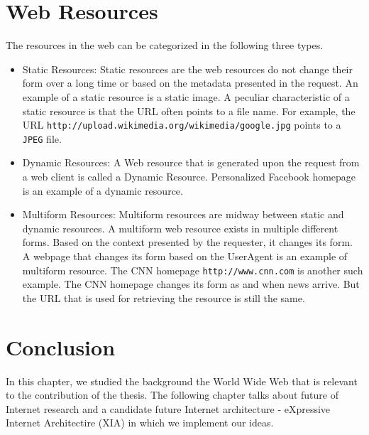 \section{Web Resources}
The resources in the web can be categorized in the following three
types.

\begin{itemize}
  \item{Static Resources: Static resources are the web resources do
    not change their form over a long time or based on the metadata
    presented in the request. An example of a static resource is a
    static image. A peculiar characteristic of a static resource is
    that the URL often points to a file name. For example, the URL
    \texttt{http://upload.wikimedia.org/wikimedia/google.jpg} points
    to a \texttt{JPEG} file.}
  \item{Dynamic Resources: A Web resource that is generated upon the
    request from a web client is called a Dynamic
    Resource. Personalized Facebook homepage is an example of a
    dynamic resource.}
  \item{Multiform Resources: Multiform resources are midway between
    static and dynamic resources. A multiform web resource exists in
    multiple different forms. Based on the context presented by the
    requester, it changes its form. A webpage that changes its form
    based on the UserAgent is an example of multiform resource. The
    CNN homepage \texttt{http://www.cnn.com} is another such
    example. The CNN homepage changes its form as and when news
    arrive. But the URL that is used for retrieving the resource is
    still the same.}
\end{itemize}

\section{Conclusion}
In this chapter, we studied the background the World Wide Web that is
relevant to the contribution of the thesis. The following chapter
talks about future of Internet research and a candidate future
Internet architecture - eXpressive Internet Architectire (XIA) in
which we implement our ideas.
